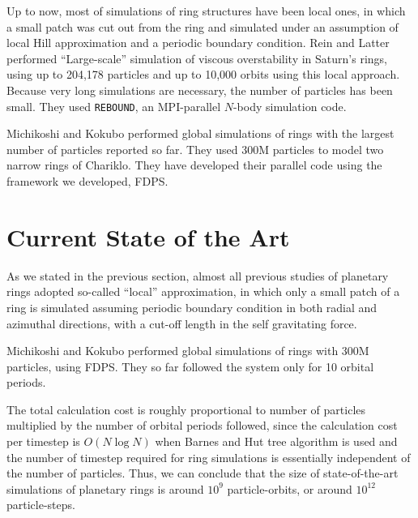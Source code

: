 \documentclass[conference]{IEEEtran}
\begin{document}
Up to now, most of simulations of ring structures have been local
ones, in which a small patch  was cut out from the ring and simulated
under an assumption of local Hill approximation and a periodic
boundary condition\cite{WisdomTremaine1988}. Rein and Latter\cite{ReinLatter2013}
performed ``Large-scale'' simulation of viscous
overstability in Saturn's rings, using up to 204,178 particles and up
to 10,000 orbits using this local approach.  Because very long
simulations are necessary, the number of particles has been
small. They used {\tt REBOUND}\cite{ReinLiu2012}, an MPI-parallel
$N$-body simulation code.


Michikoshi and Kokubo\cite{MichikoshiKokubo2017} performed global simulations of rings with
the largest number of particles reported so far. They used 300M particles to
model two narrow rings of Chariklo. They have developed their parallel
code using the framework we developed, FDPS\cite{Iwasawaetal2016}. 

\section{Current State of the Art}




As we stated in the previous section, almost all previous studies of
planetary rings adopted so-called ``local'' approximation, in which
only a small patch of a ring is simulated assuming periodic boundary
condition in both radial and azimuthal directions,
with a cut-off length in the self gravitating force. 

Michikoshi and Kokubo\cite{MichikoshiKokubo2017} performed global
simulations of rings with 300M particles, using
FDPS\cite{Iwasawaetal2016}. They so far followed the system only for
10 orbital periods.

The total calculation cost is roughly proportional to number of
particles multiplied by the number of orbital periods followed, since
the calculation cost per timestep is $O(N \log N)$ when Barnes and Hut
tree algorithm is used and the number of timestep required for ring
simulations is essentially independent of the number of
particles. Thus, we can conclude that the size of state-of-the-art
simulations of planetary rings is around $10^9$ particle-orbits, or
around $10^{12}$ particle-steps.
\end{document}
